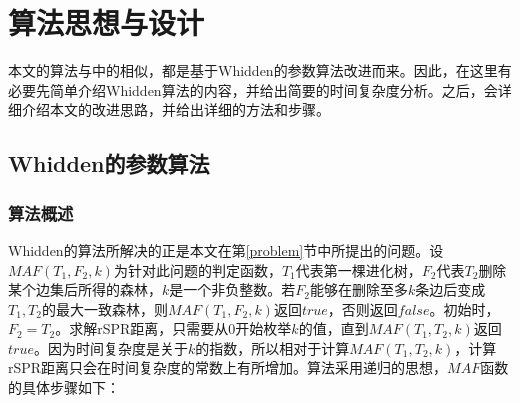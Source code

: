 
\chapter{算法思想与设计}
本文的算法与\cite{chen2012faster}中的相似，都是基于Whidden的参数算法改进而来。因此，在这里有必要先简单介绍Whidden算法的内容，并给出简要的时间复杂度分析。之后，会详细介绍本文的改进思路，并给出详细的方法和步骤。

\section{Whidden的参数算法}
\subsection{算法概述} \label{whidden_algo}

Whidden的算法所解决的正是本文在第\ref{problem}节中所提出的问题。设$MAF(T_1,F_2,k)$为针对此问题的判定函数，$T_1$代表第一棵进化树，$F_2$代表$T_2$删除某个边集后所得的森林，$k$是一个非负整数。若$F_2$能够在删除至多$k$条边后变成$T_1,T_2$的最大一致森林，则$MAF(T_1,F_2,k)$返回$true$，否则返回$false$。初始时，$F_2 = T_2$。求解rSPR距离，只需要从$0$开始枚举$k$的值，直到$MAF(T_1,T_2,k)$返回$true$。因为时间复杂度是关于$k$的指数，所以相对于计算$MAF(T_1,T_2,k)$，计算rSPR距离只会在时间复杂度的常数上有所增加。算法采用递归的思想，$MAF$函数的具体步骤如下：

